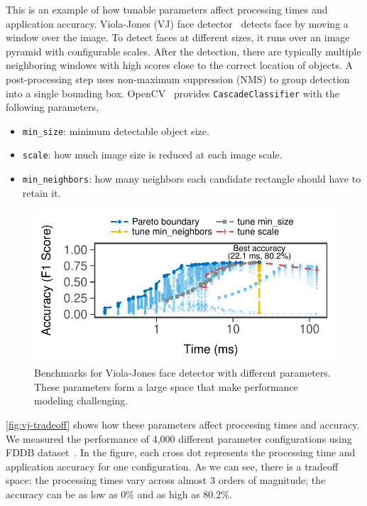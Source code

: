  This is an example of how tunable parameters
affect processing times and application accuracy. Viola-Jones (VJ) face
detector~\cite{viola2001rapid} detects face by moving a window over the image.
To detect faces at different sizes, it runs over an image pyramid with
configurable scales. After the detection, there are typically multiple
neighboring windows with high scores close to the correct location of objects.
A post-processing step uses non-maximum suppression (NMS) to group detection
into a single bounding box. OpenCV~\cite{opencvlibrary} provides
\texttt{CascadeClassifier} with the following parameters,

\begin{itemize}[noitemsep, topsep=0pt]
\item \texttt{min\_size}: minimum detectable object size.
\item \texttt{scale}: how much image size is reduced at each image scale.
\item \texttt{min\_neighbors}: how many neighbors each candidate rectangle should
  have to retain it.
\end{itemize}

\begin{figure}[t]
  \centering
  \includegraphics[width=.8\columnwidth]{figures/exhaustive-face.pdf}
  \caption{Benchmarks for Viola-Jones face detector with different
    parameters. These parameters form a large space that make performance
    modeling challenging.}
  \label{fig:vj-tradeoff}
\end{figure}

\autoref{fig:vj-tradeoff} shows how these parameters affect processing times and
accuracy. We measured the performance of 4,000 different parameter
configurations using FDDB dataset~\cite{jain2010fddb}. In the figure, each cross
dot represents the processing time and application accuracy for one
configuration. As we can see, there is a tradeoff space: the processing times
vary across almost 3 orders of magnitude; the accuracy can be as low as 0\% and
as high as 80.2\%.

